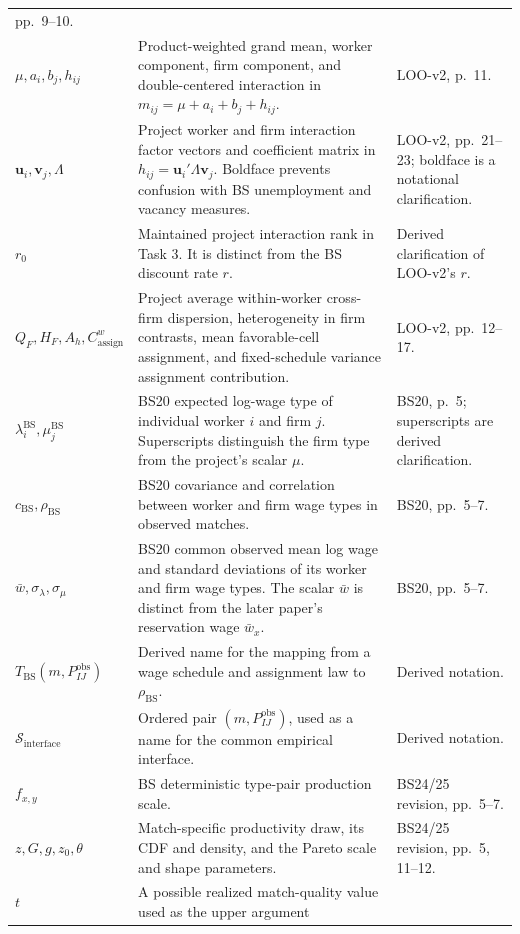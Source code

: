 \documentclass[11pt]{article}
\begin{document}
\begin{longtable}{p{}p{}p{}}
pp.\ 9--10. \\
\(\mu,a_i,b_j,h_{ij}\) & Product-weighted grand mean, worker component, firm
component, and double-centered interaction in
\(m_{ij}=\mu+a_i+b_j+h_{ij}\). & LOO-v2, p.\ 11. \\
\(\mathbf u_i,\mathbf v_j,\Lambda\) & Project worker and firm interaction
factor vectors and coefficient matrix in
\(h_{ij}=\mathbf u_i'\Lambda\mathbf v_j\).  Boldface prevents confusion with
BS unemployment and vacancy measures. & LOO-v2, pp.\ 21--23; boldface is a
notational clarification. \\
\(r_0\) & Maintained project interaction rank in Task 3.  It is distinct from
the BS discount rate \(r\). & Derived clarification of LOO-v2's \(r\). \\
\(Q_F,H_F,A_h,C^w_{\mathrm{assign}}\) & Project average within-worker
cross-firm dispersion, heterogeneity in firm contrasts, mean favorable-cell
assignment, and fixed-schedule variance assignment contribution. & LOO-v2,
pp.\ 12--17. \\
\(\lambda_i^{\mathrm{BS}},\mu_j^{\mathrm{BS}}\) & BS20 expected log-wage type
of individual worker \(i\) and firm \(j\).  Superscripts distinguish the firm
type from the project's scalar \(\mu\). & BS20, p.\ 5; superscripts are
derived clarification. \\
\(c_{\mathrm{BS}},\rho_{\mathrm{BS}}\) & BS20 covariance and correlation
between worker and firm wage types in observed matches. & BS20, pp.\ 5--7. \\
\(\bar w,\sigma_\lambda,\sigma_\mu\) & BS20 common observed mean log wage and
standard deviations of its worker and firm wage types.  The scalar
\(\bar w\) is distinct from the later paper's reservation wage
\(\bar w_x\). & BS20, pp.\ 5--7. \\
\(T_{\mathrm{BS}}(m,P^{\mathrm{obs}}_{IJ})\) & Derived name for the mapping
from a wage schedule and assignment law to \(\rho_{\mathrm{BS}}\). & Derived
notation. \\
\(\mathcal S_{\mathrm{interface}}\) & Ordered pair
\((m,P^{\mathrm{obs}}_{IJ})\), used as a name for the common empirical
interface. & Derived notation. \\
\(f_{x,y}\) & BS deterministic type-pair production scale. & BS24/25
revision, pp.\ 5--7. \\
\(z,G,g,z_0,\theta\) & Match-specific productivity draw, its CDF and density,
and the Pareto scale and shape parameters. & BS24/25 revision, pp.\ 5,
11--12. \\
\(t\) & A possible realized match-quality value used as the upper argument

\end{longtable}
\end{document}
